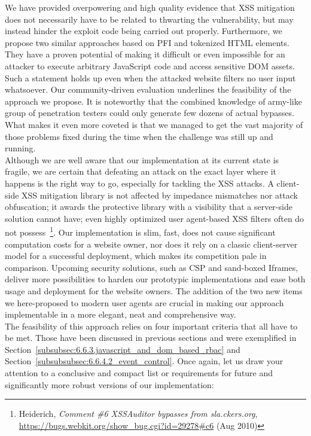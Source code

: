     We have provided overpowering and high quality evidence that XSS mitigation does not necessarily have to be related to thwarting the vulnerability, but may instead hinder the exploit code being carried out properly. Furthermore, we propose two similar approaches based on PFI and tokenized HTML elements. They have a proven potential of making it difficult or even impossible for an attacker to execute arbitrary JavaScript code and access sensitive DOM assets. Such a statement holds up even when the attacked website filters no user input whatsoever. Our community-driven evaluation underlines the feasibility of the approach we propose. It is noteworthy that the combined knowledge of army-like group of penetration testers could only generate few dozens of actual bypasses. What makes it even more coveted is that we managed to get the vast majority of those problems fixed during the time when the challenge was still up and running. \\

    Although we are well aware that our implementation at its current state is fragile, we are certain that defeating an attack on the exact layer where it happens is the right way to go, especially for tackling the XSS attacks. A client-side XSS mitigation library is not affected by impedance mismatches nor attack obfuscation; it awards the protective library with a visibility that a server-side solution cannot have; even highly optimized user agent-based XSS filters often do not possess~\footnote{Heiderich, \textit{Comment \#6 XSSAuditor bypasses from sla.ckers.org}, \url{https://bugs.webkit.org/show_bug.cgi?id=29278#c6} (Aug 2010)}. Our implementation is slim, fast, does not cause significant computation costs for a website owner, nor does it rely on a classic client-server model for a successful deployment, which makes its competition pale in comparison. Upcoming security solutions, such as CSP and sand-boxed Iframes, deliver more possibilities to harden our prototypic implementations and ease both usage and deployment for the website owners. The addition of the two new items we here-proposed to modern user agents are crucial in making our approach implementable in a more elegant, neat and comprehensive way. \\

    The feasibility of this approach relies on four important criteria that all have to be met. Those have been discussed in previous sections and were exemplified in Section~\ref{subsubsec:6.6.3.javascript_and_dom_based_rbac} and Section~\ref{subsubsubsec:6.6.4.2_event_control}. Once again, let us draw your attention to a conclusive and compact list or requirements for future and significantly more robust versions of our implementation:

